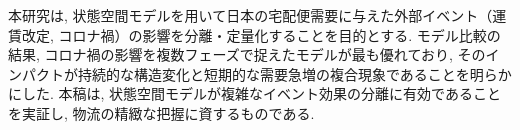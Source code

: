 本研究は, 状態空間モデルを用いて日本の宅配便需要に与えた外部イベント（運賃改定, コロナ禍）の影響を分離・定量化することを目的とする. 
モデル比較の結果, コロナ禍の影響を複数フェーズで捉えたモデルが最も優れており, 
そのインパクトが持続的な構造変化と短期的な需要急増の複合現象であることを明らかにした. 
本稿は, 状態空間モデルが複雑なイベント効果の分離に有効であることを実証し, 物流の精緻な把握に資するものである. 